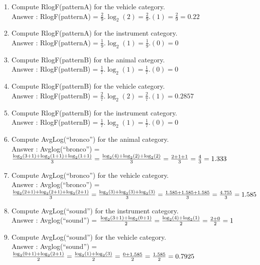 \documentclass[11pt]{article}
\begin{document}
\begin{enumerate}
\begin{enumerate}
\item Compute RlogF(patternA) for the {\sc vehicle} category. \\
Answer : RlogF(patternA) = $\frac{2}{9}.\log_2 (2) = \frac{2}{9}.(1) = \frac{2}{9} =  0.22$
\item Compute RlogF(patternA) for the {\sc instrument} category. \\
Answer : RlogF(patternA) = $\frac{1}{9}.\log_2 (1) = \frac{1}{9}.(0) = 0$

\item Compute RlogF(patternB) for the {\sc animal} category. \\
Answer : RlogF(patternB) = $\frac{1}{7}.\log_2 (1) = \frac{1}{7}.(0) = 0$

\item Compute RlogF(patternB) for the {\sc vehicle} category. \\
Answer : RlogF(patternB) = $\frac{2}{7}.\log_2 (2) = \frac{2}{7}.(1) = 0.2857$

\item Compute RlogF(patternB) for the {\sc instrument} category. \\
Answer : RlogF(patternB) = $\frac{1}{7}.\log_2 (1) = \frac{1}{7}.(0) = 0$

\item Compute AvgLog(``bronco'') for the {\sc animal} category. \\
Answer : Avglog(``bronco'') = $\frac{\log_2 (3+1) + \log_2 (1+1) + \log_2 (1+1)}{3} \\= \frac{\log_2 (4) + \log_2 (2)+ \log_2 (2)}{3} = \frac{2+1+1}{3} = \frac{4}{3} = 1.333$

\item Compute AvgLog(``bronco'') for the {\sc vehicle} category. \\
Answer : Avglog(``bronco'') = $\frac{\log_2 (2+1) + \log_2 (2+1) + \log_2 (2+1)}{3} \\= \frac{\log_2 (3) + \log_2 (3) + \log_2 (3)}{3} = \frac{1.585+1.585+1.585}{3} = \frac{4.755}{3} = 1.585$
\item Compute AvgLog(``sound'') for the {\sc instrument} category. \\
Answer : Avglog(``sound'') = $\frac{ \log_2 (3+1) + \log_2 (0+1)}{2} \\= \frac{\log_2 (4) + \log_2 (1)}{2} = \frac{2+0}{2} = 1$
\item Compute AvgLog(``sound'') for the {\sc vehicle} category.\\ 
Answer : Avglog(``sound'') = $\frac{ \log_2 (0+1) + \log_2 (2+1)}{2} \\= \frac{\log_2 (1) + \log_2 (3)}{2} = \frac{0+1.585}{2} = \frac{1.585}{2} = 0.7925$
\end{enumerate}



\end{enumerate}
\end{document}
